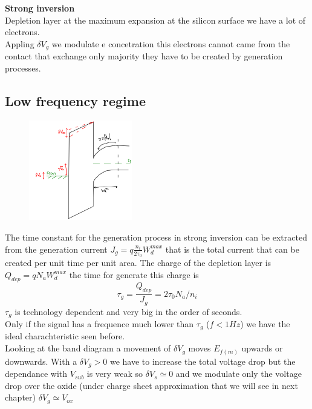 \vspace{5mm}
{\bf Strong inversion}\\
Depletion layer at the maximum expansion at the silicon surface we have a lot of electrons.\\ 
Appling $\delta V_g$ we modulate e concetration this electrons cannot came from the contact that exchange only majority they have to be created by generation processes.\\

\subsection{Low frequency regime}

\begin{figure}
\includegraphics[width=0.4\textwidth]{lfbd.png}
\end{figure}
The time constant for the generation process in strong inversion can be extracted from the generation current $J_g=q\frac{n_i}{2\tau_0}W_d^{max}$ that is the total current that can be created per unit time per unit area. The charge of the depletion layer is $Q_{dep}=qN_aW_d^{max}$ the time for generate this charge is 
\begin{equation}
\tau_g=\frac{Q_{dep}}{J_g}=2\tau_0N_a/n_i
\end{equation}
$\tau_g$ is technology dependent and very big in the order of seconds.\\
Only if the signal has a frequence much lower than $\tau_g$ ($f<1Hz$) we have the ideal charachteristic seen before.\\
Looking at the band diagram a movement of $\delta V_g$ moves $E_{f(m)}$ upwards or downwards. With a $\delta V_g>0$ we have to increase the total voltage drop but the dependance with $V_{sub}$ is very weak so $\delta V_s\simeq 0$ and we modulate only the voltage drop over the oxide (under charge sheet approximation that we will see in next chapter) $\delta V_g\simeq V_{ox}$


